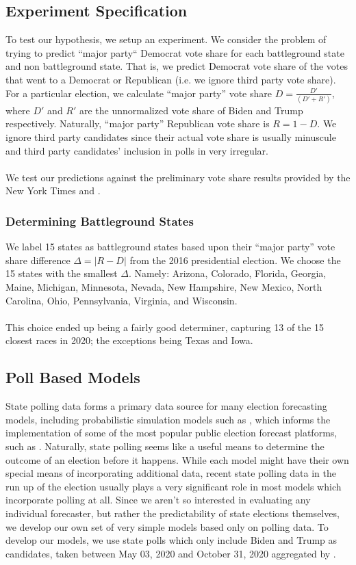 \subsection{Experiment Specification}
To test our hypothesis, we setup an experiment. We consider the problem of trying to predict ``major party`` Democrat vote share for each battleground state and non battleground state. That is, we predict Democrat vote share of the votes that went to a Democrat or Republican (i.e. we ignore third party vote share). For a particular election, we calculate ``major party'' vote share $D = \frac{D'}{(D' + R')}$, where $D'$ and $R'$ are the unnormalized vote share of Biden and Trump respectively. Naturally, ``major party'' Republican vote share is $R = 1-D$. We ignore third party candidates since their actual vote share is usually minuscule and third party candidates' inclusion in polls in very irregular.
\\~\\
We test our predictions against the preliminary vote share results provided by the New York Times and \cite{scraper}.

\subsubsection{Determining Battleground States}
We label 15 states as battleground states based upon their ``major party'' vote share difference $\Delta = |R - D|$ from the 2016 presidential election. We choose the 15 states with the smallest $\Delta$. Namely: Arizona, Colorado, Florida, Georgia, Maine, Michigan, Minnesota, Nevada, New Hampshire, New Mexico, North Carolina, Ohio, Pennsylvania, Virginia, and Wisconsin.
\\~\\
This choice ended up being a fairly good determiner, capturing 13 of the 15 closest races in 2020; the exceptions being Texas and Iowa.

\subsection{Poll Based Models}
State polling data forms a primary data source for many election forecasting models, including probabilistic simulation models such as \cite{Linzer2013DynamicBF}, which informs the implementation of some of the most popular public election forecast platforms, such as \cite{fivethirtyeight, economist}. Naturally, state polling seems like a useful means to determine the outcome of an election before it happens. While each model might have their own special means of incorporating additional data, recent state polling data in the run up of the election usually plays a very significant role in most models which incorporate polling at all. Since we aren't so interested in evaluating any individual forecaster, but rather the predictability of state elections themselves, we develop our own set of very simple models based only on polling data. To develop our models, we use state polls which only include Biden and Trump as candidates, taken between May 03, 2020 and October 31, 2020 aggregated by \cite{fivethirtyeight}.

